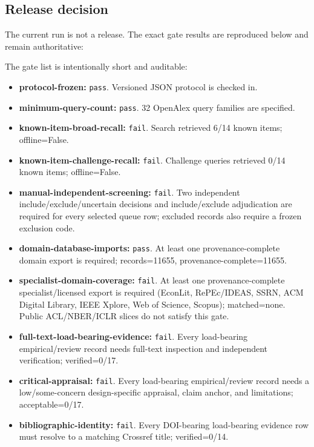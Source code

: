 \documentclass[11pt]{article}
\providecommand{\tightlist}{\setlength{\itemsep}{0pt}\setlength{\parskip}{0pt}}
\begin{document}
\hypertarget{release-decision}{%
\subsection{Release decision}\label{release-decision}}

The current run is not a release. The exact gate results are reproduced below and remain authoritative:

The gate list is intentionally short and auditable:

\begin{itemize}
\tightlist
\item
  \textbf{protocol-frozen:} \texttt{pass}. Versioned JSON protocol is checked in.
\item
  \textbf{minimum-query-count:} \texttt{pass}. 32 OpenAlex query families are specified.
\item
  \textbf{known-item-broad-recall:} \texttt{fail}. Search retrieved 6/14 known items; offline=False.
\item
  \textbf{known-item-challenge-recall:} \texttt{fail}. Challenge queries retrieved 0/14 known items; offline=False.
\item
  \textbf{manual-independent-screening:} \texttt{fail}. Two independent include/exclude/uncertain decisions and include/exclude adjudication are required for every selected queue row; excluded records also require a frozen exclusion code.
\item
  \textbf{domain-database-imports:} \texttt{pass}. At least one provenance-complete domain export is required; records=11655, provenance-complete=11655.
\item
  \textbf{specialist-domain-coverage:} \texttt{fail}. At least one provenance-complete specialist/licensed export is required (EconLit, RePEc/IDEAS, SSRN, ACM Digital Library, IEEE Xplore, Web of Science, Scopus); matched=none. Public ACL/NBER/ICLR slices do not satisfy this gate.
\item
  \textbf{full-text-load-bearing-evidence:} \texttt{fail}. Every load-bearing empirical/review record needs full-text inspection and independent verification; verified=0/17.
\item
  \textbf{critical-appraisal:} \texttt{fail}. Every load-bearing empirical/review record needs a low/some-concern design-specific appraisal, claim anchor, and limitations; acceptable=0/17.
\item
  \textbf{bibliographic-identity:} \texttt{fail}. Every DOI-bearing load-bearing evidence row must resolve to a matching Crossref title; verified=0/14.

\end{itemize}
\end{document}
